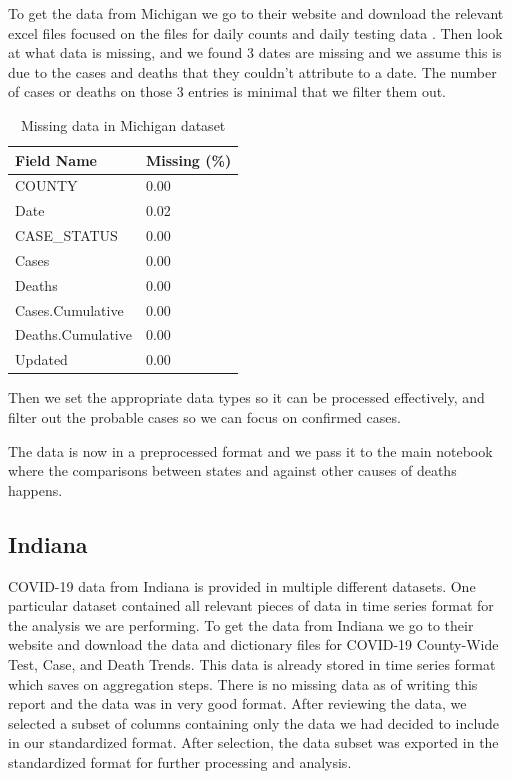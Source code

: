 \documentclass[conference]{IEEEtran}
\begin{document}
To get the data from Michigan we go to their website and download the relevant excel files focused on the files for daily counts and daily testing data \cite{noauthor_coronavirus_nodate}.
Then look at what data is missing, and we found 3 dates are missing and we assume this is due to the cases and deaths that they couldn't attribute to a date. 
The number of cases or deaths on those 3 entries is minimal that we filter them out.
\begin{table}
  \centering
\begin{tabular}{ll}
  \toprule
  Field Name & Missing (\%) \\
  \midrule
  COUNTY            &  0.00 \\
  Date              &  0.02 \\
  CASE\_STATUS       &  0.00 \\
  Cases             &  0.00 \\
  Deaths            &  0.00 \\
  Cases.Cumulative  &  0.00 \\
  Deaths.Cumulative &  0.00 \\
  Updated           &  0.00 \\
  \bottomrule
  \end{tabular}
  \caption{Missing data in Michigan dataset}
  \label{tab:Michigan:missing}
\end{table}

Then we set the appropriate data types so it can be processed effectively, and filter out the probable cases so we can focus on confirmed cases.

The data is now in a preprocessed format and we pass it to the main notebook where the comparisons between states and against other causes of deaths happens.


\subsection{Indiana}

COVID-19 data from Indiana is provided in multiple different datasets. 
One particular dataset contained all relevant pieces of data in time series format for the analysis we are performing.
To get the data from Indiana we go to their website and download the data and dictionary files for COVID-19 County-Wide Test, Case, and Death Trends.
This data is already stored in time series format which saves on aggregation steps.
There is no missing data as of writing this report and the data was in very good format. After reviewing the data, we selected a subset of columns containing only the data we had decided to include in our standardized format. After selection, the data subset was exported in the standardized format for further processing and analysis.
\end{document}
